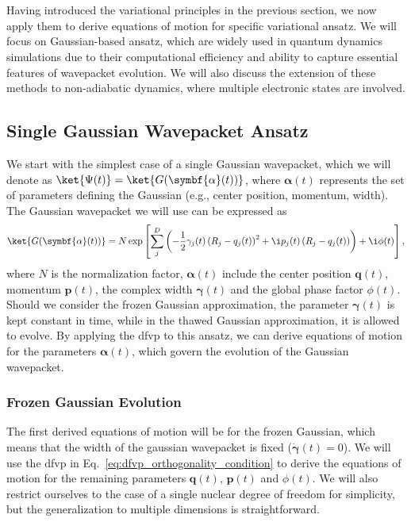 \section{\filetotitle}\label{sec:variational_principles_eom}
Having introduced the variational principles in the previous section, we now apply them to derive equations of motion for specific variational ansatz. We will focus on Gaussian-based ansatz, which are widely used in quantum dynamics simulations due to their computational efficiency and ability to capture essential features of wavepacket evolution. We will also discuss the extension of these methods to non-adiabatic dynamics, where multiple electronic states are involved.
\subsection{Single Gaussian Wavepacket Ansatz}
We start with the simplest case of a single Gaussian wavepacket, which we will denote as $\ket{\Psi(t)}=\ket{G(\symbf{\alpha}(t))}$, where $\symbf{\alpha}(t)$ represents the set of parameters defining the Gaussian (e.g., center position, momentum, width). The Gaussian wavepacket we will use can be expressed as
\begin{equation}
\ket{G(\symbf{\alpha}(t))}=N\exp\left[\sum_j^D\left(-\frac{1}{2}\gamma_j(t)\left(R_j-q_j(t)\right)^2+\i p_j(t)\left(R_j-q_j(t)\right)\right)+\i\phi(t)\right],
\end{equation}
where $N$ is the normalization factor, $\symbf{\alpha}(t)$ include the center position $\symbf{q}(t)$, momentum $\symbf{p}(t)$, the complex width $\symbf{\gamma}(t)$ and the global phase factor $\phi(t)$. Should we consider the frozen Gaussian approximation, the parameter $\symbf{\gamma}(t)$ is kept constant in time, while in the thawed Gaussian approximation, it is allowed to evolve. By applying the \acrshort{dfvp} to this ansatz, we can derive equations of motion for the parameters $\symbf{\alpha}(t)$, which govern the evolution of the Gaussian wavepacket.
\subsubsection{Frozen Gaussian Evolution}
The first derived equations of motion will be for the frozen Gaussian, which means that the width of the gaussian wavepacket is fixed ($\dot{\symbf{\gamma}}(t)=0$). We will use the \acrshort{dfvp} in Eq.~\eqref{eq:dfvp_orthogonality_condition} to derive the equations of motion for the remaining parameters $\symbf{q}(t)$, $\symbf{p}(t)$ and $\phi(t)$. We will also restrict ourselves to the case of a single nuclear degree of freedom for simplicity, but the generalization to multiple dimensions is straightforward.

